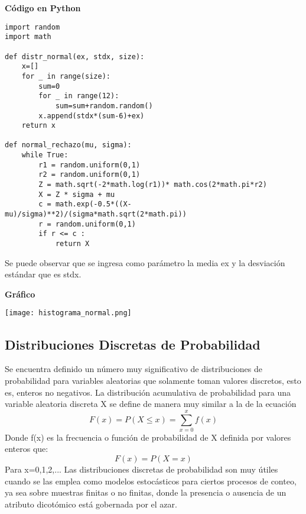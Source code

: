 \documentclass[11pt]{article}
\begin{document}
\noindent\textbf{Código en Python}\\

\begin{lstlisting}
import random
import math

def distr_normal(ex, stdx, size):
    x=[]
    for _ in range(size):
        sum=0
        for _ in range(12):
            sum=sum+random.random()
        x.append(stdx*(sum-6)+ex)
    return x

def normal_rechazo(mu, sigma):
    while True:
        r1 = random.uniform(0,1)
        r2 = random.uniform(0,1)
        Z = math.sqrt(-2*math.log(r1))* math.cos(2*math.pi*r2)
        X = Z * sigma + mu 
        c = math.exp(-0.5*((X-mu)/sigma)**2)/(sigma*math.sqrt(2*math.pi))
        r = random.uniform(0,1)
        if r <= c :
            return X
\end{lstlisting}
Se puede observar que se ingresa como parámetro la media ex y la desviación estándar que es stdx.

\noindent\textbf{Gráfico}\\

\begin{center}
\texttt{[image: histograma\_normal.png]}
\end{center}


\subsection{Distribuciones Discretas de Probabilidad}
Se encuentra definido un número muy significativo de distribuciones de probabilidad para variables aleatorias que solamente toman valores discretos, esto es, enteros no negativos. La distribución acumulativa de probabilidad para una variable aleatoria discreta X se define de manera muy similar a la de la ecuación
\begin{equation}
F(x) = P(X \leq x) = \sum_{x=0}^{x}f(x)
\end{equation}
Donde f(x) es la frecuencia o función de probabilidad de X definida por valores enteros que:
\begin{equation}
F(x) = P(X= x)
\end{equation}
Para x=0,1,2,...
Las distribuciones discretas de probabilidad son muy útiles cuando se las emplea como modelos estocásticos para ciertos procesos de conteo, ya sea sobre muestras finitas o no finitas, donde la presencia o ausencia de un atributo dicotómico está gobernada por el azar.
\end{document}
